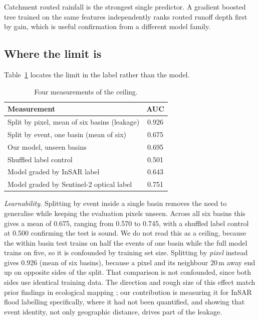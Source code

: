 \documentclass[10pt,conference]{IEEEtran}
\begin{document}
Catchment routed rainfall is the strongest single predictor. A gradient boosted
tree trained on the same features independently ranks routed runoff depth first
by gain, which is useful confirmation from a different model family.

\subsection{Where the limit is}
\label{sec:ceiling}
Table~\ref{tab:ceiling} locates the limit in the label rather than the model.

\begin{table}[t]
\caption{Four measurements of the ceiling.}
\label{tab:ceiling}
\centering
\begin{tabular}{lc}
\toprule
Measurement & AUC \\
\midrule
Split by pixel, mean of six basins (leakage) & 0.926 \\
Split by event, one basin (mean of six)     & 0.675 \\
Our model, unseen basins                    & 0.695 \\
Shuffled label control                      & 0.501 \\
\midrule
Model graded by InSAR label                 & 0.643 \\
Model graded by Sentinel-2 optical label    & 0.751 \\
\bottomrule
\end{tabular}
\end{table}

\emph{Learnability.} Splitting by event inside a single basin removes the need
to generalise while keeping the evaluation pixels unseen. Across all six basins
this gives a mean of 0.675, ranging from 0.570 to 0.745, with a shuffled label
control at 0.500 confirming the test is sound. We do not read this as a ceiling,
because the within basin test trains on half the events of one basin while the
full model trains on five, so it is confounded by training set size. Splitting by
\emph{pixel} instead gives 0.926 (mean of six basins), because a pixel and its neighbour 20\,m away
end up on opposite sides of the split. That comparison is not confounded, since
both sides use identical training data. The direction and rough size of this
effect match prior findings in ecological mapping \cite{ploton2020}; our
contribution is measuring it for InSAR flood labelling specifically, where it
had not been quantified, and showing that event identity, not only geographic
distance, drives part of the leakage.
\end{document}
